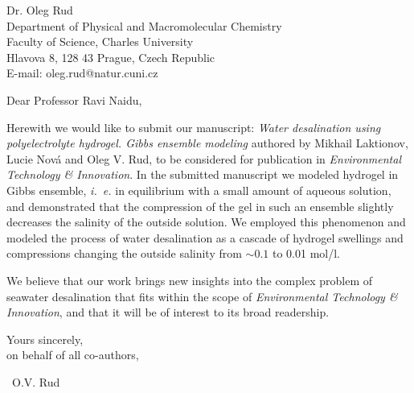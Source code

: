 \documentclass[12pt]{dinbrief}
\date{\today}
\newcommand{\theeditor}{Professor Ravi Naidu}
\newcommand{\thejournal}{\textit{Environmental Technology \& Innovation}}
\newcommand{\ie}{\textit{i.~e.} }
\begin{document}
\begin{letter}{
Dr. Oleg Rud\\
Department of Physical and Macromolecular Chemistry\\
Faculty of Science, Charles University\\
Hlavova 8, 128 43 Prague, Czech Republic\\
E-mail: oleg.rud@natur.cuni.cz\\
}
\vspace*{-1.5cm}

\opening{Dear \theeditor,}

Herewith we would like to submit our manuscript: \textit{Water desalination using polyelectrolyte hydrogel. Gibbs ensemble modeling}
authored by
Mikhail Laktionov, Lucie Nová and Oleg V. Rud,
 to be considered for publication in \thejournal. 
In the submitted manuscript we modeled hydrogel in Gibbs ensemble, \ie in equilibrium with a small amount of aqueous solution, and demonstrated that the compression of the gel in such an ensemble slightly decreases the salinity of the outside solution. 
We employed this phenomenon and modeled the process of water desalination as a cascade of hydrogel swellings and compressions changing the outside salinity from $\sim 0.1$ to 0.01 mol/l.

We believe that our work brings new insights into the complex problem of seawater desalination
that fits within the scope of \thejournal, and that it will be of interest to its broad readership.

\vspace{5ex}







Yours sincerely,\\
on behalf of all co-authors,

\hspace{80ex}\ O.V. Rud\\







\end{letter}
\end{document}
